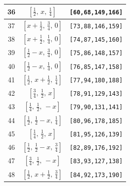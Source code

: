 \documentclass[fleqn,8pt]{jsarticle}
\begin{document}
\begin{longtable}{ccc}
36 & $\left[ \frac{1}{2},\, x,\, \frac{1}{4} \right]$ & {\tt [60,68,149,166]} \\ \hline
37 & $\left[ x + \frac{1}{2},\, \frac{3}{4},\, 0 \right]$ & {\tt [73,88,146,159]} \\ \hline
38 & $\left[ x + \frac{1}{2},\, \frac{1}{4},\, 0 \right]$ & {\tt [74,87,145,160]} \\ \hline
39 & $\left[ \frac{1}{2} - x,\, \frac{3}{4},\, 0 \right]$ & {\tt [75,86,148,157]} \\ \hline
40 & $\left[ \frac{1}{2} - x,\, \frac{1}{4},\, 0 \right]$ & {\tt [76,85,147,158]} \\ \hline
41 & $\left[ \frac{1}{2},\, x + \frac{1}{2},\, \frac{1}{4} \right]$ & {\tt [77,94,180,188]} \\ \hline
42 & $\left[ \frac{3}{4},\, \frac{1}{2},\, x \right]$ & {\tt [78,91,129,143]} \\ \hline
43 & $\left[ \frac{1}{4},\, \frac{1}{2},\, - x \right]$ & {\tt [79,90,131,141]} \\ \hline
44 & $\left[ \frac{1}{2},\, \frac{1}{2} - x,\, \frac{1}{4} \right]$ & {\tt [80,96,178,185]} \\ \hline
45 & $\left[ \frac{1}{4},\, \frac{1}{2},\, x \right]$ & {\tt [81,95,126,139]} \\ \hline
46 & $\left[ \frac{1}{2},\, \frac{1}{2} - x,\, \frac{3}{4} \right]$ & {\tt [82,89,176,192]} \\ \hline
47 & $\left[ \frac{3}{4},\, \frac{1}{2},\, - x \right]$ & {\tt [83,93,127,138]} \\ \hline
48 & $\left[ \frac{1}{2},\, x + \frac{1}{2},\, \frac{3}{4} \right]$ & {\tt [84,92,173,190]} \\
\end{longtable}
\renewcommand{\arraystretch}{1.2}
\end{document}
